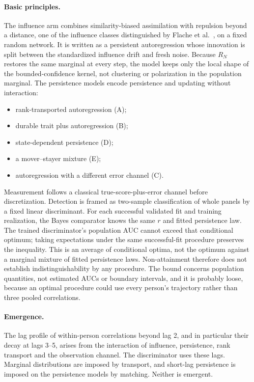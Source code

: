 \paragraph{Basic principles.}
The influence arm combines similarity-biased assimilation with repulsion beyond a distance, one of the influence classes distinguished by Flache et al.\ \cite{flache2017}, on a fixed random network. It is written as a persistent autoregression whose innovation is split between the standardized influence drift and fresh noise. Because $R_N$ restores the same marginal at every step, the model keeps only the local shape of the bounded-confidence kernel, not clustering or polarization in the population marginal. The persistence models encode persistence and updating without interaction:
\begin{itemize}
\item rank-transported autoregression (A);
\item durable trait plus autoregression (B);
\item state-dependent persistence (D);
\item a mover--stayer mixture (E);
\item autoregression with a different error channel (C).
\end{itemize}
Measurement follows a classical true-score-plus-error channel before discretization. Detection is framed as two-sample classification of whole panels by a fixed linear discriminant. For each successful validated fit and training realization, the Bayes comparator knows the same $r$ and fitted persistence law. The trained discriminator's population AUC cannot exceed that conditional optimum; taking expectations under the same successful-fit procedure preserves the inequality. This is an average of conditional optima, not the optimum against a marginal mixture of fitted persistence laws. Non-attainment therefore does not establish indistinguishability by any procedure. The bound concerns population quantities, not estimated AUCs or boundary intervals, and it is probably loose, because an optimal procedure could use every person's trajectory rather than three pooled correlations.

\paragraph{Emergence.}
The lag profile of within-person correlations beyond lag 2, and in particular their decay at lags 3--5, arises from the interaction of influence, persistence, rank transport and the observation channel. The discriminator uses these lags. Marginal distributions are imposed by transport, and short-lag persistence is imposed on the persistence models by matching. Neither is emergent.

